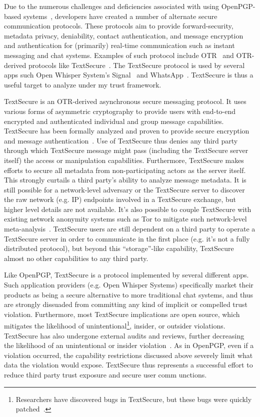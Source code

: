 Due to the numerous challenges and deficiencies associated with using
OpenPGP-based systems~\cite{green-pgp}, developers have created a
number of alternate secure communication protocols. These protocols
aim to provide forward-security, metadata privacy, deniability,
contact authentication, and message encryption and authentication for
(primarily) real-time communication such as instant messaging and chat
systems. Examples of such protocol include OTR~\cite{otr-v3} and
OTR-derived protocols like TextSecure~\cite{otr-advanced-ratchet}. The
TextSecure protocol is used by several apps such Open Whisper System's
Signal~\cite{openwhisper} and WhatsApp~\cite{whatsapp}. TextSecure is
thus a useful target to analyze under my trust framework.

TextSecure is an OTR-derived asynchronous secure messaging
protocol. It uses various forms of asymmetric cryptography to provide
users with end-to-end encrypted and authenticated individual and group
message capabilities. TextSecure has been formally analyzed and proven
to provide secure encryption and message
authentication~\cite{frosch2014}. Use of TextSecure thus denies any
third party through which TextSecure message might pass (including the
TextSecure server itself) the access or manipulation
capabilities. Furthermore, TextSecure makes efforts to secure all
metadata from non-participating actors as the server itself. This
strongly curtails a third party's ability to analyze message
metadata. It is still possible for a network-level adversary or the
TextSecure server to discover the raw network (e.g. IP) endpoints
involved in a TextSecure exchange, but higher level details are not
available. It's also possible to couple TextSecure with existing
network anonymity systems such as Tor to mitigate such network-level
meta-analysis~\cite{intercept-chatting}. TextSecure users are still
dependent on a third party to operate a TextSecure server in order to
communicate in the first place (e.g. it's not a fully distributed
protocol), but beyond this ``storage''-like capability, TextSecure
almost no other capabilities to any third party.

Like OpenPGP, TextSecure is a protocol implemented by several
different apps. Such application providers (e.g. Open Whisper Systems)
specifically market their products as being a secure alternative to
more traditional chat systems, and thus are strongly dissuaded from
committing any kind of implicit or compelled trust
violation. Furthermore, most TextSecure implications are open source,
which mitigates the likelihood of unintentional\footnote{Researchers
  have discovered bugs in TextSecure, but these bugs were quickly
  patched~\cite{frosch2014}.}, insider, or outsider
violations. TextSecure has also undergone external audits and reviews,
further decreasing the likelihood of an unintentional or insider
violation~\cite{frosch2014}. As in OpenPGP, even if a violation
occurred, the capability restrictions discussed above severely limit
what data the violation would expose. TextSecure thus represents a
successful effort to reduce third party trust exposure and secure user
comm unctions.


